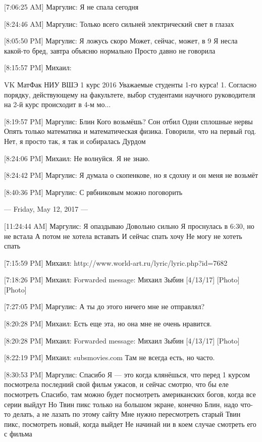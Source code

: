 \documentclass{article}
\begin{document}
[7:06:25 AM] Маргулис:
Я не спала сегодня

[8:24:46 AM] Маргулис:
Только всего сильней электрический свет в глазах

[8:05:50 PM] Маргулис:
Я ложусь скоро
 Может, сейчас, может, в 9
 Я несла какой-то бред, завтра объясню нормально
 Просто давно не говорила

[8:15:57 PM] Михаил:

VK
МатФак НИУ ВШЭ 1 курс 2016
Уважаемые студенты 1-го курса! 1. Согласно порядку, действующему на факультете, выбор студентами научного руководителя на 2-й курс происходит в 4-м мо...

[8:19:57 PM] Маргулис:
Блин
 Кого возьмёшь?
 Сон отбил
 Одни сплошные нервы
 Опять только математика и математическая физика. Говорили, что на первый год. Нет, я просто так, я так и собиралась
 Дурдом

[8:24:06 PM] Михаил:
Не волнуйся. Я не знаю.

[8:24:42 PM] Маргулис:
Я думала о скопенкове, но я сдохну и он меня не возьмёт

[8:40:36 PM] Маргулис:
С рвбниковым можно поговорить

--- Friday, May 12, 2017 ---

[11:24:44 AM] Маргулис:
Я опаздываю
 Довольно сильно
 Я проснулась в 6:30, но не встала
 А потом не хотела вставать
 И сейчас спать хочу
 Не могу не хотеть спать

[7:15:59 PM] Михаил:
http://www.world-art.ru/lyric/lyric.php?id=7682

[7:18:26 PM] Михаил:
Forwarded message: Михаил Зыбин [4/13/17] 
[Photo]
[Photo]

[7:27:05 PM] Маргулис:
А ты до этого ничего мне не отправлял?

[8:20:28 PM] Михаил:
Есть еще эта, но она мне не очень нравится.

[8:20:28 PM] Михаил:
Forwarded message: Михаил Зыбин [4/13/17] 
[Photo]

[8:22:19 PM] Михаил:
subsmovies.com Там не всегда есть, но часто.

[8:30:53 PM] Маргулис:
Спасибо
 Я — это когда клянёшься, что перед 1 курсом посмотрела последний свой фильм ужасов, и сейчас смотрю, что бы еле посмотреть
 Спасибо, там можно будет посмотреть американских богов, когда все серии выйдут
 Но Твин пикс только на большом экране, конечно
 Блин, надо что-то делать, а не лазать по этому сайту
 Мне нужно пересмотреть старый Твин пикс, посмотреть новый, когда выйдет
 Не начинай ни в коем случае смотреть его с фильма
\end{document}
